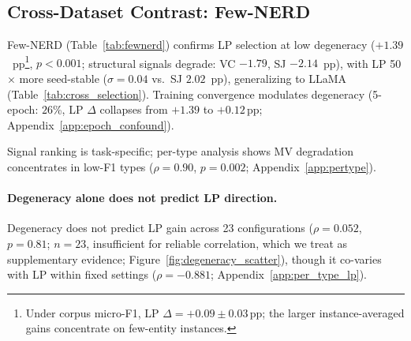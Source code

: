 \subsection{Cross-Dataset Contrast: Few-NERD}\label{sec:fewnerd}

\begin{table}[t]
\centering
\small
\caption{LP selection across datasets (instance-averaged F1; Qwen3-8B, $N{=}8$, $T{=}1.0$, gold-filtered, 3-seed means). $p$: paired bootstrap.}
\label{tab:fewnerd}
\end{table}

Few-NERD (Table~\ref{tab:fewnerd}) confirms LP selection at low degeneracy ($+1.39$~pp\footnote{Under corpus micro-F1, LP $\Delta{=}+0.09{\pm}0.03$\,pp; the larger instance-averaged gains concentrate on few-entity instances.}, $p{<}0.001$; structural signals degrade: VC $-1.79$, SJ $-2.14$~pp), with LP 50$\times$ more seed-stable ($\sigma{=}0.04$ vs.\ SJ $2.02$~pp), generalizing to LLaMA (Table~\ref{tab:cross_selection}). Training convergence modulates degeneracy (5-epoch: $26$\%, LP $\Delta$ collapses from $+1.39$ to $+0.12$\,pp; Appendix~\ref{app:epoch_confound}).

Signal ranking is task-specific; per-type analysis shows MV degradation concentrates in low-F1 types ($\rho{=}0.90$, $p{=}0.002$; Appendix~\ref{app:pertype}).

\paragraph{Degeneracy alone does not predict LP direction.}
Degeneracy does not predict LP gain across 23 configurations ($\rho{=}0.052$, $p{=}0.81$; $n{=}23$, insufficient for reliable correlation, which we treat as supplementary evidence; Figure~\ref{fig:degeneracy_scatter}), though it co-varies with LP within fixed settings ($\rho{=}{-}0.881$; Appendix~\ref{app:per_type_lp}).

